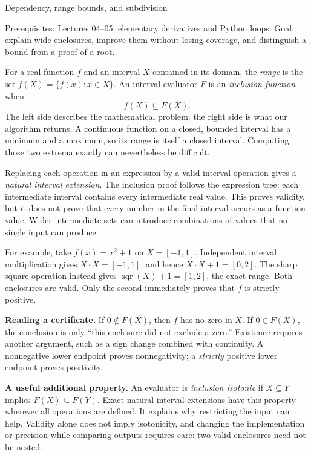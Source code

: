 \def\lecturenumber{06}


\opening{Dependency, range bounds, and subdivision}{Prerequisites: Lectures 04--05; elementary derivatives and Python loops.\newline
Goal: explain wide enclosures, improve them without losing coverage, and distinguish a bound from a proof of a root.}

For a real function $f$ and an interval $X$ contained in its domain, the
\emph{range} is the set $f(X)=\{f(x):x\in X\}$. An interval evaluator $F$
is an \emph{inclusion function} when
\[
                     f(X)\subseteq F(X).
\]
The left side describes the mathematical problem; the right side is what our
algorithm returns. A continuous function on a closed, bounded interval has a
minimum and a maximum, so its range is itself a closed interval. Computing
those two extrema exactly can nevertheless be difficult.

Replacing each operation in an expression by a valid interval operation gives
a \emph{natural interval extension}. The inclusion proof follows the expression
tree: each intermediate interval contains every intermediate real value.
This proves validity, but it does not prove that every number in the final
interval occurs as a function value. Wider intermediate sets can introduce
combinations of values that no single input can produce.

For example, take $f(x)=x^2+1$ on $X=[-1,1]$. Independent interval multiplication
gives $X\cdot X=[-1,1]$, and hence $X\cdot X+1=[0,2]$. The sharp square operation
instead gives $\operatorname{sqr}(X)+1=[1,2]$, the exact range. Both enclosures
are valid. Only the second immediately proves that $f$ is strictly positive.

\textbf{Reading a certificate.} If $0\notin F(X)$, then $f$ has no zero in $X$.
If $0\in F(X)$, the conclusion is only ``this enclosure did not exclude a
zero.'' Existence requires another argument, such as a sign change combined
with continuity. A nonnegative lower endpoint proves nonnegativity; a
\emph{strictly} positive lower endpoint proves positivity.

\textbf{A useful additional property.} An evaluator is \emph{inclusion isotonic}
if $X\subseteq Y$ implies $F(X)\subseteq F(Y)$. Exact natural interval
extensions have this property wherever all operations are defined. It explains
why restricting the input can help. Validity alone does not imply isotonicity,
and changing the implementation or precision while comparing outputs requires
care: two valid enclosures need not be nested.


